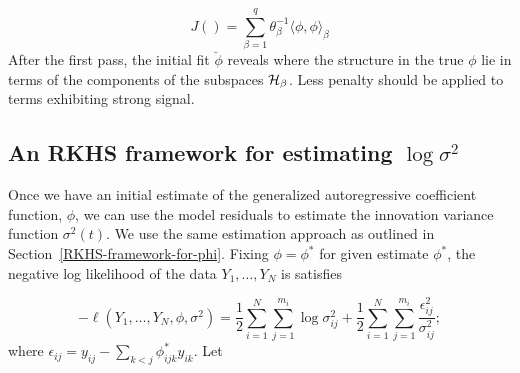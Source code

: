 \[
J\left(\right)= \sum_{\beta = 1}^q \theta^{-1}_\beta \langle \phi, \phi\rangle_\beta
\]
\noindent
After the first pass, the initial fit $\breve{\phi}$ reveals where the structure in the true $\phi$ lie in terms of the components of the subspaces $\mathcal{H}_\beta$. Less penalty should be applied to terms exhibiting strong signal.  


\subsection{An RKHS framework for estimating $\log \sigma^2$}
%


Once we have an initial estimate of the generalized autoregressive coefficient function, $\phi$, we can use the model residuals to estimate the innovation variance function $\sigma^2\left(t\right)$. We use the same estimation approach as outlined in Section~\ref{RKHS-framework-for-phi}. Fixing $\phi = \phi^*$ for given estimate $\phi^*$, the negative log likelihood of the data $Y_1,\dots, Y_N$ is satisfies

\begin{equation} \label{eq:penalized-joint-loglik-given-phi-2}
-\ell\left( Y_1,\dots, Y_N, \phi, \sigma^2 \right) =  \frac{1}{2}\sum_{i = 1}^N \sum_{j = 1}^{m_i} \log \sigma^2_{ij}  + \frac{1}{2}\sum_{i = 1}^N \sum_{j = 1}^{m_i} \frac {\epsilon_{ij}^2}{\sigma^2_{ij}};
\end{equation}
\noindent
where $\epsilon_{ij} =  y_{ij} - \sum_{k<j} \phi^*_{ijk} y_{ik}$. Let 

